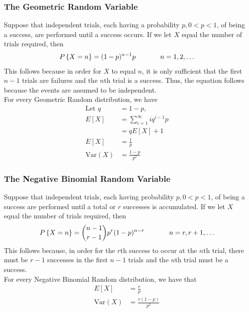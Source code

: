 \documentclass[a4paper]{article}
\begin{document}
\subsubsection{The Geometric Random Variable}
Suppose that independent trials, each having a probability $p, 0 < p < 1$, of being a success, are performed until a success occurs. If we let $X$ equal the number of trials required, then 
\begin{align}
  P\left\{ X=n \right\} = (1-p)^{n-1}p \hspace{.5in} n=1,2,\dots
\end{align}
This follows because in order for $X$ to equal $n$, it is only sufficient that the first $n-1$ trials are failures and the $n$th trial is a success. Thus, the equation follows because the events are assumed to be independent. \\
For every Geometric Random distribution, we have \\
\begin{align}
  \text{Let } q & = 1-p, \\
  E[X] &  = \sum_{i=1}^\infty i q^{i-1}p \\
  & = q E[X]+1 \\
  E[X] & = \frac{1}{p} \\
  \text{Var}(X) & = \frac{1-p}{p^2}
\end{align}
\subsubsection{The Negative Binomial Random Variable}
Suppose that independent trials, each having probability $p,0<p<1$, of being a success are performed until a total or $r$ successes is accumulated. If we let $X$ equal the number of trials required, then
\begin{align}
  P\left\{ X=n \right\}= {n-1 \choose r-1} p^r (1-p)^{n-r} \hspace{.5in} n=r,r+1,\dots
\end{align}
This follows because, in order for the $r$th success to occur at the $n$th trial, there must be $r-1$ successes in the first $n-1$ trials and the $n$th trial must be a success. \\
For every Negative Binomial Random distribution, we have that 
\begin{align}
  E[X] & = \frac{r}{p} \\
  \text{Var}(X) & = \frac{r(1-p)}{p^2}
\end{align}
\end{document}
